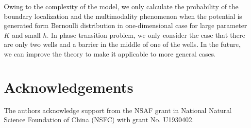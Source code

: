 \documentclass[a4paper,11pt]{article}
\begin{document}
Owing to the complexity of the model, we only calculate the probability of the boundary localization and the multimodality phenomenon when the potential is generated form Bernoulli distribution in one-dimensional case for large parameter $K$ and small $h$. In phase transition problem, we only consider the case that there are only two wells and a barrier in the middle of one of the wells. In the future, we can improve the theory to make it applicable to more general cases.

\section*{Acknowledgements}
The authors acknowledge support from the NSAF grant in National Natural Science Foundation of China (NSFC) with grant No. U1930402.

\setlength{\bibsep}{5pt}
\small

\end{document}

